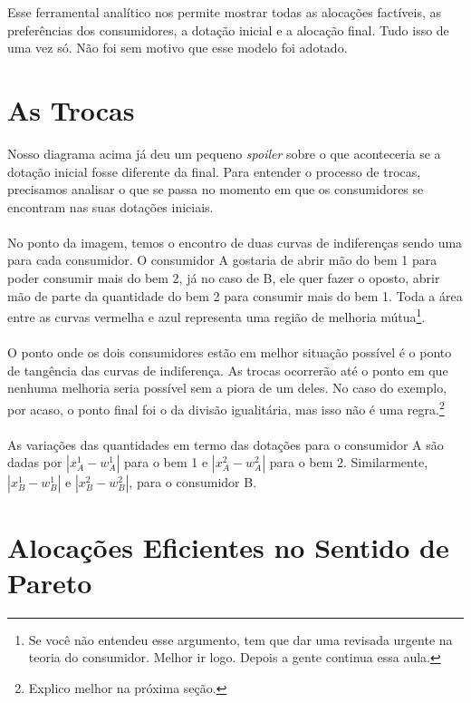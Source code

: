\documentclass[a4paper,11pt,oneside]{book}
\theoremstyle{definition}
\theoremstyle{break}
\begin{document}
Esse ferramental analítico nos permite mostrar todas as alocações factíveis, as preferências dos consumidores, a dotação inicial e a alocação final. Tudo isso de uma vez só. Não foi sem motivo que esse modelo foi adotado.

\section{As Trocas}

Nosso diagrama acima já deu um pequeno \textit{spoiler} sobre o que aconteceria se a dotação inicial fosse diferente da final. Para entender o processo de trocas, precisamos analisar o que se passa no momento em que os consumidores se encontram nas suas dotações iniciais.
\\
\\
No ponto da imagem, temos o encontro de duas curvas de indiferenças sendo uma para cada consumidor. O consumidor A gostaria de abrir mão do bem 1 para poder consumir mais do bem 2, já no caso de B, ele quer fazer o oposto, abrir mão de parte da quantidade do bem 2 para consumir mais do bem 1. Toda a área entre as curvas vermelha e azul representa uma região de melhoria mútua\footnote{Se você não entendeu esse argumento, tem que dar uma revisada urgente na teoria do consumidor. Melhor ir logo. Depois a gente continua essa aula.}.
\\
\\
O ponto onde os dois consumidores estão em melhor situação possível é o ponto de tangência das curvas de indiferença. As trocas ocorrerão até o ponto em que nenhuma melhoria seria possível sem a piora de um deles. No caso do exemplo, por acaso, o ponto final foi o da divisão igualitária, mas isso não é uma regra.\footnote{Explico melhor na próxima seção.}
\\
\\
As variações das quantidades em termo das dotações para o consumidor A são dadas por $|x_A^1 - w_A^1|$ para o bem 1 e $|x_A^2 - w_A^2|$ para o bem 2. Similarmente, $|x_B^1 - w_B^1|$ e $|x_B^2 - w_B^2|$, para o consumidor B.

\section{Alocações Eficientes no Sentido de Pareto}
\end{document}
